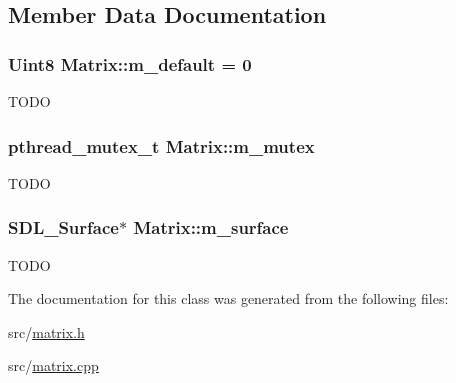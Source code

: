 \subsection{Member Data Documentation}
\hypertarget{classMatrix_a128eca9782b86bae0eed3d1d0967249e}{
\subsubsection[{m\_\-default}]{\setlength{\rightskip}{0pt plus 5cm}Uint8 {\bf Matrix::m\_\-default} = 0}}
\label{classMatrix_a128eca9782b86bae0eed3d1d0967249e}
TODO \hypertarget{classMatrix_aba01078d3f7abfceae9f6ce1913bbdc3}{
\subsubsection[{m\_\-mutex}]{\setlength{\rightskip}{0pt plus 5cm}pthread\_\-mutex\_\-t {\bf Matrix::m\_\-mutex}}}
\label{classMatrix_aba01078d3f7abfceae9f6ce1913bbdc3}
TODO \hypertarget{classMatrix_a76ecc20ed053f699bcf299958be9f4a1}{
\subsubsection[{m\_\-surface}]{\setlength{\rightskip}{0pt plus 5cm}SDL\_\-Surface$\ast$ {\bf Matrix::m\_\-surface}}}
\label{classMatrix_a76ecc20ed053f699bcf299958be9f4a1}
TODO 

The documentation for this class was generated from the following files:\begin{DoxyCompactItemize}
\item 
src/\hyperlink{matrix_8h}{matrix.h}\item 
src/\hyperlink{matrix_8cpp}{matrix.cpp}\end{DoxyCompactItemize}
